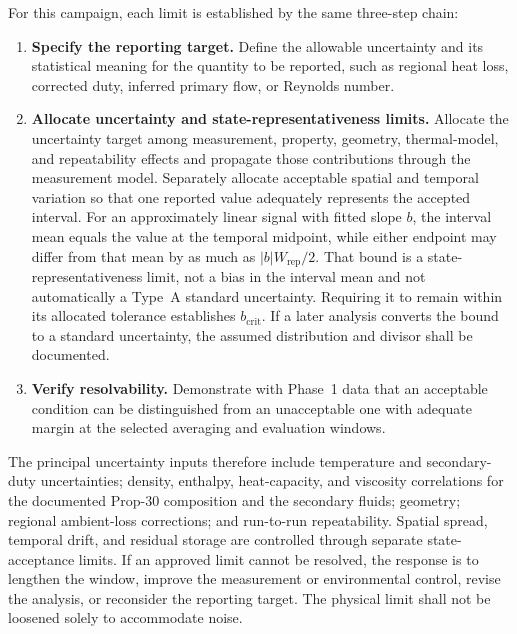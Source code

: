 \documentclass[11pt]{article}
\begin{document}
For this campaign, each limit is established by the same three-step chain:
\begin{enumerate}
    \item \textbf{Specify the reporting target.} Define the allowable uncertainty and its statistical meaning for the quantity to be reported, such as regional heat loss, corrected duty, inferred primary flow, or Reynolds number.
    \item \textbf{Allocate uncertainty and state-representativeness limits.} Allocate the uncertainty target among measurement, property, geometry, thermal-model, and repeatability effects and propagate those contributions through the measurement model. Separately allocate acceptable spatial and temporal variation so that one reported value adequately represents the accepted interval. For an approximately linear signal with fitted slope $b$, the interval mean equals the value at the temporal midpoint, while either endpoint may differ from that mean by as much as $|b|W_{\mathrm{rep}}/2$. That bound is a state-representativeness limit, not a bias in the interval mean and not automatically a Type~A standard uncertainty. Requiring it to remain within its allocated tolerance establishes $b_{\mathrm{crit}}$. If a later analysis converts the bound to a standard uncertainty, the assumed distribution and divisor shall be documented.
    \item \textbf{Verify resolvability.} Demonstrate with Phase~1 data that an acceptable condition can be distinguished from an unacceptable one with adequate margin at the selected averaging and evaluation windows.
\end{enumerate}

The principal uncertainty inputs therefore include temperature and secondary-duty uncertainties; density, enthalpy, heat-capacity, and viscosity correlations for the documented Prop-30 composition and the secondary fluids; geometry; regional ambient-loss corrections; and run-to-run repeatability. Spatial spread, temporal drift, and residual storage are controlled through separate state-acceptance limits. If an approved limit cannot be resolved, the response is to lengthen the window, improve the measurement or environmental control, revise the analysis, or reconsider the reporting target. The physical limit shall not be loosened solely to accommodate noise.
\end{document}
